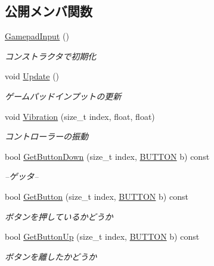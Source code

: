 \subsection*{公開メンバ関数}
\begin{DoxyCompactItemize}
\item 
\mbox{\hyperlink{class_gamepad_input_acd9878326e438f379020827d63ebd6cf}{Gamepad\+Input}} ()
\begin{DoxyCompactList}\small\item\em コンストラクタで初期化 \end{DoxyCompactList}\item 
void \mbox{\hyperlink{class_gamepad_input_a3512c0cc4d57534c83db09c4b5377caa}{Update}} ()
\begin{DoxyCompactList}\small\item\em ゲームパッドインプットの更新 \end{DoxyCompactList}\item 
void \mbox{\hyperlink{class_gamepad_input_afd429d32d076130ff8a7df12037eaddd}{Vibration}} (size\+\_\+t index, float, float)
\begin{DoxyCompactList}\small\item\em コントローラーの振動 \end{DoxyCompactList}\item 
bool \mbox{\hyperlink{class_gamepad_input_a29a71d0503e038e55ffe282e2c768b05}{Get\+Button\+Down}} (size\+\_\+t index, \mbox{\hyperlink{gamepad__input_8h_a739845b0076428add52ca3cec492e705}{B\+U\+T\+T\+ON}} b) const
\begin{DoxyCompactList}\small\item\em --ゲッタ-- \end{DoxyCompactList}\item 
bool \mbox{\hyperlink{class_gamepad_input_a9a2f9042a5fa1c8e33fbd349f67747b3}{Get\+Button}} (size\+\_\+t index, \mbox{\hyperlink{gamepad__input_8h_a739845b0076428add52ca3cec492e705}{B\+U\+T\+T\+ON}} b) const
\begin{DoxyCompactList}\small\item\em ボタンを押しているかどうか \end{DoxyCompactList}\item 
bool \mbox{\hyperlink{class_gamepad_input_a5b76a114b8d3d03abbd2bcd91562109a}{Get\+Button\+Up}} (size\+\_\+t index, \mbox{\hyperlink{gamepad__input_8h_a739845b0076428add52ca3cec492e705}{B\+U\+T\+T\+ON}} b) const
\begin{DoxyCompactList}\small\item\em ボタンを離したかどうか \end{DoxyCompactList}\item 

\end{DoxyCompactItemize}
